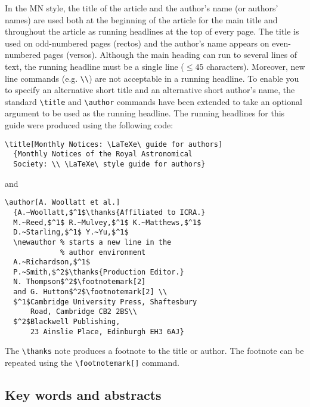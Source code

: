 \documentclass[useAMS,usenatbib]{mn2e}
\begin{document}
In the MN style, the title of the article and the author's name
(or authors' names) are used both at the beginning of the article
for the main title and throughout the article as running headlines
at the top of every page. The title is used on odd-numbered pages
(rectos) and the author's name appears on even-numbered pages
(versos). Although the main heading can run to several lines of
text, the running headline must be a single line ($\le 45$
characters). Moreover, new line commands (e.g. \verb"\\")
are not acceptable in a running headline. To enable you to
specify an alternative short title and an alternative short
author's name, the standard \verb"\title" and \verb"\author"
commands have been extended to take an optional argument to be
used as the running headline. The running headlines for this guide
were produced using the following code:
%
\begin{verbatim}
\title[Monthly Notices: \LaTeXe\ guide for authors]
  {Monthly Notices of the Royal Astronomical
  Society: \\ \LaTeXe\ style guide for authors}
\end{verbatim}
%
and
%
\begin{verbatim}
\author[A. Woollatt et al.]
  {A.~Woollatt,$^1$\thanks{Affiliated to ICRA.}
  M.~Reed,$^1$ R.~Mulvey,$^1$ K.~Matthews,$^1$
  D.~Starling,$^1$ Y.~Yu,$^1$
  \newauthor % starts a new line in the
             % author environment
  A.~Richardson,$^1$
  P.~Smith,$^2$\thanks{Production Editor.}
  N. Thompson$^2$\footnotemark[2]
  and G. Hutton$^2$\footnotemark[2] \\
  $^1$Cambridge University Press, Shaftesbury
      Road, Cambridge CB2 2BS\\
  $^2$Blackwell Publishing,
      23 Ainslie Place, Edinburgh EH3 6AJ}
\end{verbatim}
%
The \verb"\thanks" note produces a footnote to the title or
author. The footnote can be repeated using the
\verb"\footnotemark[]" command.

\subsection{Key words and abstracts}
\end{document}
